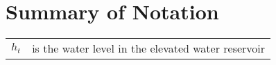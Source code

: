 \chapter*{Summary of Notation}

\begin{center}
	\begin{tabular}{l p{14cm}}
		$ h_{t} $ & is the water level in the elevated water reservoir \\
	\end{tabular}
\end{center}